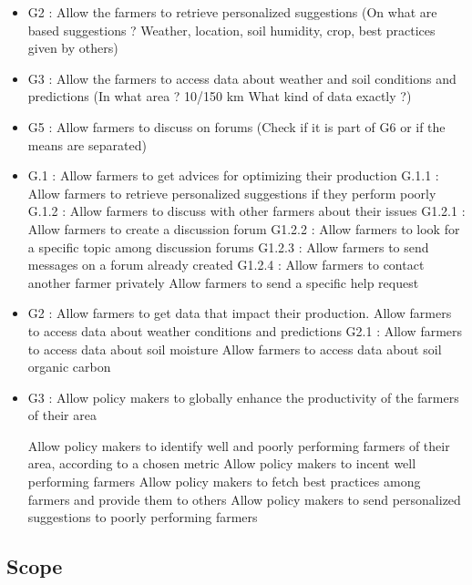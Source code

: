 \begin{itemize}
	\item 
	G2 : Allow the farmers to retrieve personalized suggestions (On what are based suggestions ? Weather, location, soil humidity, crop, best practices given by others)
	\item
	G3 : Allow the farmers to access data about weather and soil conditions and predictions (In what area ? 10/150 km What kind of data exactly ?)
	\item
	G5 : Allow farmers to discuss on forums (Check if it is part of G6 or if the means are separated)
	\item
	G.1 : Allow farmers to get advices for optimizing their production
	\subitem
	G.1.1 : Allow farmers to retrieve personalized suggestions if they perform poorly
	\subitem
	G.1.2 : Allow farmers to discuss with other farmers about their issues
	\subitem
	G1.2.1 : Allow farmers to create a discussion forum
	\subitem
	G1.2.2 : Allow farmers to look for a specific topic among discussion forums
	\subitem
	G1.2.3 : Allow farmers to send messages on a forum already created
	\subitem
	G1.2.4 : Allow farmers to contact another farmer privately	
	Allow farmers to send a specific help request
	\item
	G2 : Allow farmers to get data that impact their production. 
	Allow farmers to access data about weather conditions and predictions
	\subitem
	G2.1 :
	Allow farmers to access data about soil moisture
	Allow farmers to access data about soil organic carbon
	\item
	G3 : Allow policy makers to globally enhance the productivity of the farmers of their area
	
	Allow policy makers to identify well and poorly performing farmers of their area, according to a chosen metric
	Allow policy makers to incent well performing farmers
	Allow policy makers to fetch best practices among farmers and provide them to others
	Allow policy makers to send personalized suggestions to poorly performing farmers
	
\end{itemize}

\subsection{Scope}

